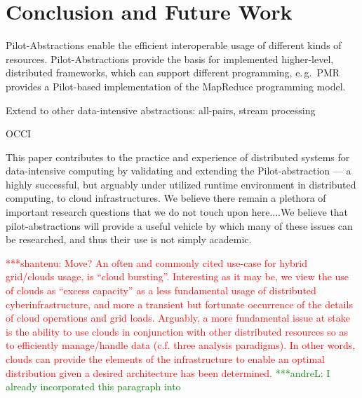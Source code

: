 \documentclass[times]{cpeauth}
\newcommand{\jhanote}[1]{ {\textcolor{red} { ***shantenu: #1 }}}
\newcommand{\alnote}[1]{ {\textcolor{green} { ***andreL: #1 }}}
\newcommand{\alnote}[1]{}
\newcommand{\jhanote}[1]{}
\newcommand{\pilot}{Pilot\xspace}
\begin{document}
\section{Conclusion and Future Work}


\pilot-Abstractions enable the efficient interoperable usage of different 
kinds of resources. \pilot-Abstractions provide the basis for implemented 
higher-level, distributed frameworks, which can support different programming, 
e.\,g.\ PMR provides a \pilot-based implementation of the MapReduce 
programming model.

Extend to other data-intensive abstractions: all-pairs, stream processing

OCCI

This paper contributes to the practice and experience of distributed
systems for data-intensive computing by validating and extending the
\pilot-abstraction --- a highly successful, but arguably under
utilized runtime environment in distributed computing, to cloud
infrastructures. We believe there remain a plethora of important
research questions that we do not touch upon here....We believe that
pilot-abstractions will provide a useful vehicle by which many of
these issues can be researched, and thus their use is not simply
academic.

\jhanote{Move? An often and commonly cited use-case for hybrid
  grid/clouds usage, is ``cloud bursting''.  Interesting as it may be,
  we view the use of clouds as ``excess capacity'' as a less
  fundamental usage of distributed cyberinfrastructure, and more a
  transient but fortunate occurrence of the details of cloud
  operations and grid loads. Arguably, a more fundamental issue at
  stake is the ability to use clouds in conjunction with other
  distributed resources so as to efficiently manage/handle data
  (c.f. three analysis paradigms). In other words, clouds can provide
  the elements of the infrastructure to enable an optimal distribution
  given a desired architecture has been determined.} \alnote{I already 
  incorporated this paragraph into}
\end{document}

